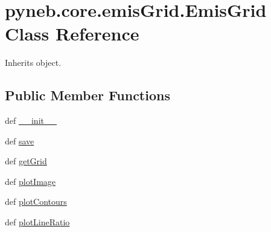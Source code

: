 \hypertarget{classpyneb_1_1core_1_1emis_grid_1_1_emis_grid}{\section{pyneb.\-core.\-emis\-Grid.\-Emis\-Grid Class Reference}
\label{classpyneb_1_1core_1_1emis_grid_1_1_emis_grid}
}


Inherits object.

\subsection*{Public Member Functions}
\begin{DoxyCompactItemize}
\item 
def \hyperlink{classpyneb_1_1core_1_1emis_grid_1_1_emis_grid_a0d2694aa16812dc5b3dba4fb8da02f57}{\-\_\-\-\_\-init\-\_\-\-\_\-}
\item 
def \hyperlink{classpyneb_1_1core_1_1emis_grid_1_1_emis_grid_a7ce505278e7503e56c2191db54e7d227}{save}
\item 
def \hyperlink{classpyneb_1_1core_1_1emis_grid_1_1_emis_grid_af9a9219e5ddfcfd53c52466e2c2deb44}{get\-Grid}
\item 
def \hyperlink{classpyneb_1_1core_1_1emis_grid_1_1_emis_grid_a36dc2ce3b34d51d04c3244b61417a5d1}{plot\-Image}
\item 
def \hyperlink{classpyneb_1_1core_1_1emis_grid_1_1_emis_grid_abea5bd314041cdd4be783a7a1d8f99a2}{plot\-Contours}
\item 
def \hyperlink{classpyneb_1_1core_1_1emis_grid_1_1_emis_grid_afa16129c399f1215de169a6e2e67b882}{plot\-Line\-Ratio}
\end{DoxyCompactItemize}
